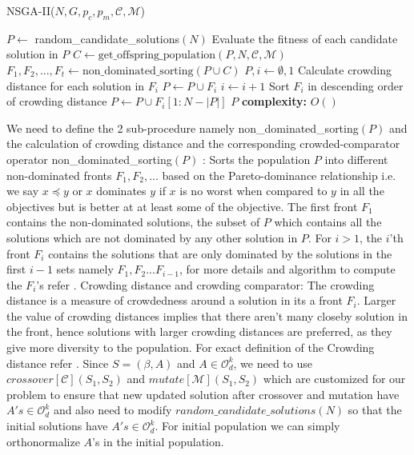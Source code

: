 \begin{algorithm}[H] \label{nsga2_psoudocode}
\caption{NSGA-II($N,G,p_c,p_m,\mathcal{C},\mathcal{M}$)}
\begin{algorithmic}[1]
\State $P \gets$ random\_candidate\_solutions$(N)$ 
\State Evaluate the fitness of each candidate solution in $P$ 
\State $C \gets \text{get\_offspring\_population}(P,N, \mathcal{C}, \mathcal{M})$
\State $F_1, F_2,..., F_t \gets \text{non\_dominated\_sorting}(P \cup C)$ 
\State $P , i \gets \emptyset, 1 $
\State Calculate crowding distance for each solution in $F_i$
\State $P \gets P \cup F_i$
\State $i \gets i+1$
\EndWhile
{}
\State Sort $F_i$ in descending order of crowding distance
\State $P \gets P \cup F_i[1:N-|P|]$ 
\EndIf 
\EndFor 
\State \Return $P$
\State \textbf{complexity: } $O()$
\end{algorithmic}
\end{algorithm}
We need to define the 2 sub-procedure namely non\_dominated\_sorting$(P)$ and the calculation of crowding distance and the corresponding crowded-comparator operator 
\newline non\_dominated\_sorting$(P)$ : Sorts the population $P$ into different non-dominated fronts $F_1,F_2,...$ based on the Pareto-dominance relationship i.e. we say $x \preceq y$ or $x$ dominates $y$ if $x$ is no worst when compared to $y$ in all the objectives but is better at at least some of the objective. The first front $F_1$ contains the non-dominated solutions, the subset of $P$ which contains all the solutions which are not dominated by any other solution in $P$. For $i>1$, the $i$'th front $F_i$ contains the solutions that are only dominated by the solutions in the first $i-1$ sets namely $F_1,F_2...F_{i-1}$, for more details and algorithm to compute the $F_i$'s refer \cite{deb2002fast}.
\newline \newline  Crowding distance and crowding comparator: The crowding distance is a measure of crowdedness around a solution in its a front $F_i$. Larger the value of crowding distances implies that there aren't many closeby solution in the front, hence solutions with larger crowding distances are preferred, as they give more diversity to the population. For exact definition of the Crowding distance refer \cite{deb2002fast}.
\newline Since $S = (\beta,A)$ and $A \in \mathcal{O}^{k}_{d}$, we need to use $crossover[\mathcal{C}](S_1,S_2)$ and $mutate[\mathcal{M}](S_1,S_2)$ which are  customized for our problem to ensure that new updated solution after crossover and mutation have $A's \in \mathcal{O}^{k}_{d}$ and also need to modify $random\_candidate\_solutions(N)$ so that the initial solutions have $A's \in \mathcal{O}^{k}_{d}$. For initial population we can simply orthonormalize $A$'s in the initial population.
